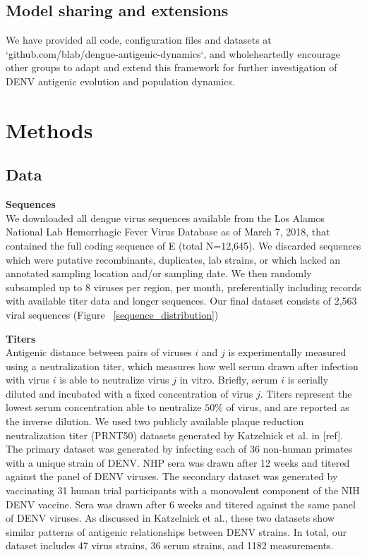 \documentclass[11pt,oneside,letterpaper]{article}
\begin{document}
\subsection*{Model sharing and extensions}
We have provided all code, configuration files and datasets at `github.com/blab/dengue-antigenic-dynamics`, and wholeheartedly encourage other groups to adapt and extend this framework for further investigation of DENV antigenic evolution and population dynamics.


\newpage

\section*{Methods}
\subsection*{Data}
\textbf{Sequences}\\
We downloaded all dengue virus sequences available from the Los Alamos National Lab Hemorrhagic Fever Virus Database as of March 7, 2018, that contained the full coding sequence of E (total N=12,645).
We discarded sequences which were putative recombinants, duplicates, lab strains, or which lacked an annotated sampling location and/or sampling date.
We then randomly subsampled up to 8 viruses per region, per month, preferentially including records with available titer data and longer sequences.
Our final dataset consists of 2,563 viral sequences (Figure ~\ref{sequence_distribution})

\textbf{Titers}\\

Antigenic distance between pairs of viruses $i$ and $j$ is experimentally measured using a neutralization titer, which measures how well serum drawn after infection with virus $i$ is able to neutralize virus $j$ in vitro.
Briefly, serum $i$ is serially diluted and incubated with a fixed concentration of virus $j$.
Titers represent the lowest serum concentration able to neutralize $50\%$ of virus, and are reported as the inverse dilution.
We used two publicly available plaque reduction neutralization titer (PRNT50) datasets generated by Katzelnick et al. in {[}ref{]}.
The primary dataset was generated by infecting each of 36 non-human primates with a unique strain of DENV.
NHP sera was drawn after 12 weeks and titered against the panel of DENV viruses.
The secondary dataset was generated by vaccinating 31 human trial participants with a monovalent component of the NIH DENV vaccine.
Sera was drawn after 6 weeks and titered against the same panel of DENV viruses.
As discussed in Katzelnick et al., these two datasets show similar patterns of antigenic relationships between DENV strains.
In total, our dataset includes 47 virus strains, 36 serum strains, and 1182 measurements.
\end{document}
